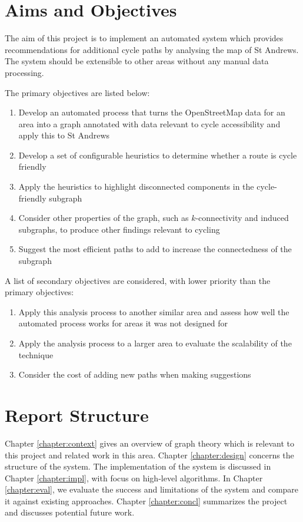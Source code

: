 \documentclass[12pt,a4paper]{report}
\begin{document}
\section{Aims and Objectives} \label{sec:aims}
The aim of this project is to implement an automated system which provides recommendations for additional cycle paths by analysing the map of St Andrews. The system should be extensible to other areas without any manual data processing.

The primary objectives are listed below:
\begin{enumerate}
    \item Develop an automated process that turns the OpenStreetMap data for an area into a graph annotated with data relevant to cycle accessibility and apply this to St Andrews
    \item Develop a set of configurable heuristics to determine whether a route is cycle friendly
    \item Apply the heuristics to highlight disconnected components in the cycle-friendly subgraph
    \item Consider other properties of the graph, such as $k$-connectivity and induced subgraphs, to produce other findings relevant to cycling
    \item Suggest the most efficient paths to add to increase the connectedness of the subgraph
\end{enumerate}

A list of secondary objectives are considered, with lower priority than the primary objectives:
\begin{enumerate}
    \item Apply this analysis process to another similar area and assess how well the automated process works for areas it was not designed for
    \item Apply the analysis process to a larger area to evaluate the scalability of the technique
    \item Consider the cost of adding new paths when making suggestions
\end{enumerate}

\section{Report Structure}
Chapter \ref{chapter:context} gives an overview of graph theory which is relevant to this project and related work in this area. Chapter \ref{chapter:design} concerns the structure of the system. The implementation of the system is discussed in Chapter \ref{chapter:impl}, with focus on high-level algorithms. In Chapter \ref{chapter:eval}, we evaluate the success and limitations of the system and compare it against existing approaches. Chapter \ref{chapter:concl} summarizes the project and discusses potential future work.
\end{document}
